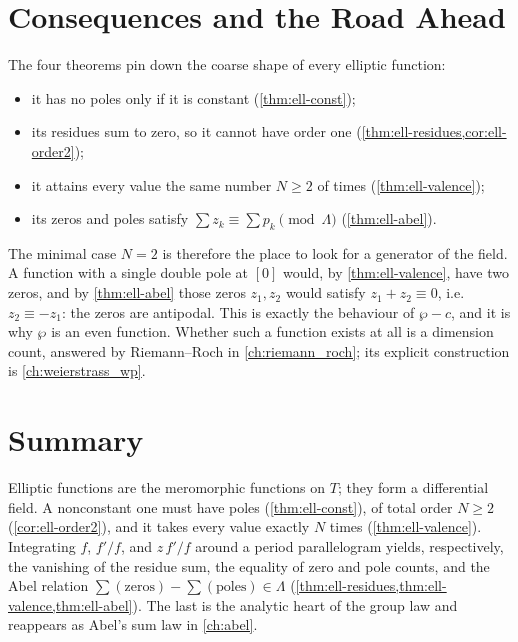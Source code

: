 \section{Consequences and the Road Ahead}
\label{sec:ell-consequences}

The four theorems pin down the coarse shape of every elliptic function:

\begin{itemize}
\item it has no poles only if it is constant (\cref{thm:ell-const});
\item its residues sum to zero, so it cannot have order one
  (\cref{thm:ell-residues,cor:ell-order2});
\item it attains every value the same number \(N \ge 2\) of times
  (\cref{thm:ell-valence});
\item its zeros and poles satisfy \(\sum z_k \equiv \sum p_k \pmod \Lambda\)
  (\cref{thm:ell-abel}).
\end{itemize}

The minimal case \(N = 2\) is therefore the place to look for a generator of the
field. A function with a single double pole at \([0]\) would, by
\cref{thm:ell-valence}, have two zeros, and by \cref{thm:ell-abel} those zeros
\(z_1, z_2\) would satisfy \(z_1 + z_2 \equiv 0\), i.e.\ \(z_2 \equiv -z_1\):
the zeros are antipodal. This is exactly the behaviour of \(\wp - c\), and it is
why \(\wp\) is an even function. Whether such a function exists at all is a
dimension count, answered by Riemann--Roch in \cref{ch:riemann_roch}; its
explicit construction is \cref{ch:weierstrass_wp}.

\section{Summary}
\label{sec:ell-summary}

Elliptic functions are the meromorphic functions on \(T\); they form a
differential field. A nonconstant one must have poles (\cref{thm:ell-const}), of
total order \(N \ge 2\) (\cref{cor:ell-order2}), and it takes every value exactly
\(N\) times (\cref{thm:ell-valence}). Integrating \(f\), \(f'/f\), and
\(z\,f'/f\) around a period parallelogram yields, respectively, the vanishing of
the residue sum, the equality of zero and pole counts, and the Abel relation
\(\sum(\text{zeros}) - \sum(\text{poles}) \in \Lambda\)
(\cref{thm:ell-residues,thm:ell-valence,thm:ell-abel}). The last is the analytic
heart of the group law and reappears as Abel's sum law in \cref{ch:abel}.

